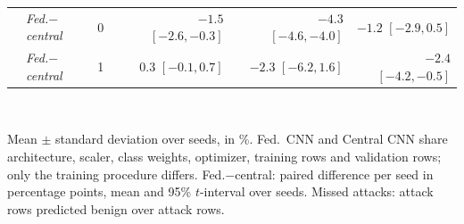 \begin{table}[t]
\begin{tabular}{lllrrrrr}
 & \emph{Fed.$-$central} & 0 & & $-1.5$ $[-2.6, -0.3]$ & & $-4.3$ $[-4.6, -4.0]$ & $-1.2$ $[-2.9, 0.5]$ \\
 & \emph{Fed.$-$central} & 1 & & 0.3 $[-0.1, 0.7]$ & & $-2.3$ $[-6.2, 1.6]$ & $-2.4$ $[-4.2, -0.5]$ \\
\bottomrule
\end{tabular}
\\[2pt]
\parbox{\linewidth}{\scriptsize Mean $\pm$ standard deviation over  seeds, in \%. Fed.\ CNN and Central CNN share architecture, scaler, class weights, optimizer, training rows and validation rows; only the training procedure differs. Fed.$-$central: paired difference per seed in percentage points, mean and 95\% $t$-interval over seeds. Missed attacks: attack rows predicted benign over attack rows.}
\end{table}
